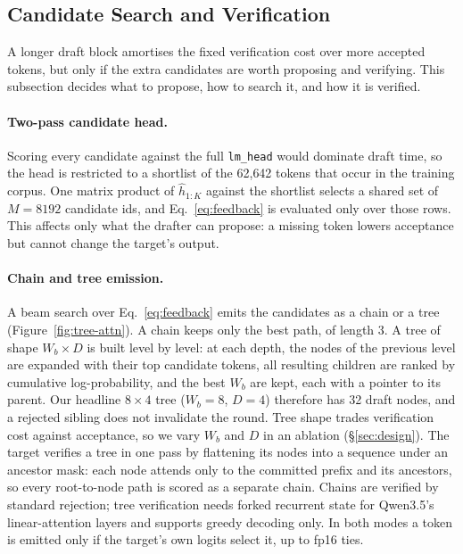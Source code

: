 \documentclass{article}
\newcommand{\TargetFamily}{Qwen3.5\xspace}          %
\newcommand{\Kserve}{3}                      %
\newcommand{\TopM}{8192}                     %
\begin{document}
\subsection{Candidate Search and Verification}
\label{sec:candidates}

A longer draft block amortises the fixed verification cost over more
accepted tokens, but only if the extra candidates are worth proposing and
verifying. This subsection decides what to propose, how to search it, and how
it is verified.

\paragraph{Two-pass candidate head.}
Scoring every candidate against the full \texttt{lm\_head} would dominate
draft time, so the head is restricted to a shortlist of the 62{,}642 tokens
that occur in the training corpus. One matrix product of $\hat h_{1:K}$
against the shortlist selects a shared set of $M=\TopM$ candidate ids, and
Eq.~\ref{eq:feedback} is evaluated only over those rows. This affects only
what the drafter can propose: a missing token lowers acceptance but cannot
change the target's output.



\paragraph{Chain and tree emission.}
A beam search over Eq.~\ref{eq:feedback} emits the candidates as a chain or a tree (Figure~\ref{fig:tree-attn}). A chain keeps only the best path, of length \Kserve{}. A tree of shape $W_b\times D$ is built level by level: at each depth, the nodes of the previous level are expanded with their top candidate tokens, all resulting children are ranked by cumulative log-probability, and the best $W_b$ are kept, each with a pointer to its parent. Our headline $8\times4$ tree ($W_b{=}8$, $D{=}4$) therefore has 32 draft nodes, and a rejected sibling does not invalidate the round. Tree shape trades verification cost against acceptance, so we vary $W_b$ and $D$ in an ablation (\S\ref{sec:design}). The target verifies a tree in one pass by flattening its nodes into a sequence under an ancestor mask: each node attends only to the committed prefix and its ancestors, so every root-to-node path is scored as a separate chain. Chains are verified by standard rejection; tree verification needs forked recurrent state for \TargetFamily's linear-attention layers and supports greedy decoding only. In both modes a token is emitted only if the target's own logits select it, up to fp16 ties.
\end{document}

